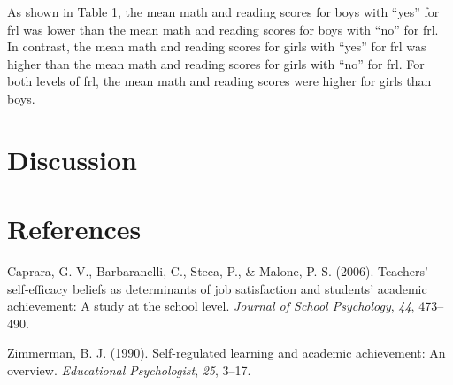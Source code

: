 \documentclass[man]{apa6}
\begin{document}
As shown in Table 1, the mean math and reading scores for boys with
\enquote{yes} for frl was lower than the mean math and reading scores
for boys with \enquote{no} for frl. In contrast, the mean math and
reading scores for girls with \enquote{yes} for frl was higher than the
mean math and reading scores for girls with \enquote{no} for frl. For
both levels of frl, the mean math and reading scores were higher for
girls than boys.

\section{Discussion}\label{discussion}

\newpage

\section{References}\label{references}

\begingroup
\setlength{\parindent}{-0.5in} \setlength{\leftskip}{0.5in}

\hypertarget{refs}{}
\hypertarget{ref-caprara2006teachers}{}
Caprara, G. V., Barbaranelli, C., Steca, P., \& Malone, P. S. (2006).
Teachers' self-efficacy beliefs as determinants of job satisfaction and
students' academic achievement: A study at the school level.
\emph{Journal of School Psychology}, \emph{44}, 473--490.

\hypertarget{ref-zimmerman1990self}{}
Zimmerman, B. J. (1990). Self-regulated learning and academic
achievement: An overview. \emph{Educational Psychologist}, \emph{25},
3--17.

\endgroup
\end{document}

